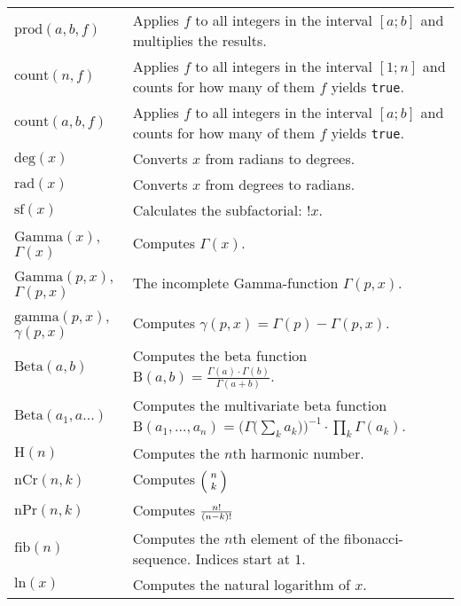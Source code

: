 \documentclass[10pt]{article}
\newcommand{\tabgap}{\vspace{3mm}\\}
\begin{document}
\begin{longtable}{p{}p{}}
        $ \mathrm{prod}(a, b, f) $                 & Applies $ f $ to all integers in the interval $ [a;b] $ and multiplies the results. \\
        $ \mathrm{count}(n, f) $                   & Applies $ f $ to all integers in the interval $ [1;n] $ and counts for how many of them $ f $ yields \verb|true|. \\
        $ \mathrm{count}(a, b, f) $                & Applies $ f $ to all integers in the interval $ [a;b] $ and counts for how many of them $ f $ yields \verb|true|. \tabgap
        $ \mathrm{deg}(x) $                        & Converts $ x $ from radians to degrees. \\
        $ \mathrm{rad}(x) $                        & Converts $ x $ from degrees to radians. \tabgap
        $ \mathrm{sf}(x) $                         & Calculates the subfactorial: $ !x $. \\
        $ \mathrm{Gamma}(x) $, $ \Gamma(x) $       & Computes $ \Gamma(x) $. \\
        $ \mathrm{Gamma}(p, x) $, $ \Gamma(p, x) $ & The incomplete Gamma-function $ \Gamma(p, x) $. \\
        $ \mathrm{gamma}(p, x) $, $ \gamma(p, x) $ & Computes $ \gamma(p, x) = \Gamma(p) - \Gamma(p, x) $. \\
        $ \mathrm{Beta}(a, b) $                    & Computes the beta function $ \mathrm{B}(a, b) = \frac{\Gamma(a) \cdot \Gamma(b)}{\Gamma(a + b)} $. \\
        $ \mathrm{Beta}(a_1, a...) $               & Computes the multivariate beta function $ \mathrm{B}(a_1, \dots, a_n) = \Big(\Gamma\big(\sum_k a_k\big)\Big)^{-1} \cdot \prod_k \Gamma(a_k) $. \\
        $ \mathrm{H}(n) $                          & Computes the $ n $th harmonic number. \tabgap
        $ \mathrm{nCr}(n, k) $                     & Computes $ \footnotesize\Bigl(\kern-2\nulldelimiterspace\begin{array}{c}n\\k\end{array}\kern-2\nulldelimiterspace\Bigr) $ \\
        $ \mathrm{nPr}(n, k) $                     & Computes $ \footnotesize\frac{n!}{(n-k)!} $ \\
        $ \mathrm{fib}(n) $                        & Computes the $ n $th element of the fibonacci-sequence. Indices start at $ 1 $. \\
        $ \mathrm{ln}(x) $                         & Computes the natural logarithm of $ x $. \\

\end{longtable}
\end{document}
